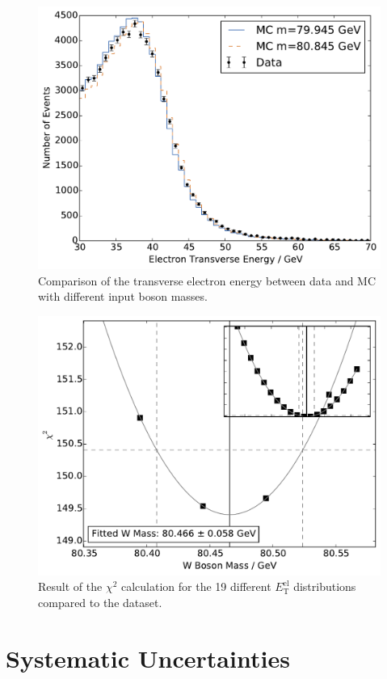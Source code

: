 \documentclass[
	paper=A4,
	parskip=full,
	chapterprefix=true,
	11pt,
	headings=normal,
	bibliography=totoc,
	listof=totoc,
	titlepage=on,
]{scrreprt}
\newcommand{\ELET}{\ensuremath{{E_\mathrm{T}^\mathrm{el}}}\xspace}
\begin{document}
\begin{figure}
	\centering
	\includegraphics{comparison_el_e_t}
	\caption{Comparison of the transverse electron energy between data and MC with different input \PW boson masses.}
	\label{fig:comparison_el_et}
\end{figure}


\begin{figure}
	\centering
	\includegraphics{chisquare_el_e_t}
	\caption{Result of the $\chi^2$ calculation for the 19 different \ELET distributions compared to the dataset.}
	\label{fig:chisquare_el_et}
\end{figure}

\section{Systematic Uncertainties}
\end{document}
